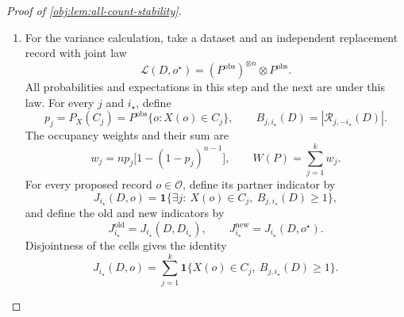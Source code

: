 \documentclass[11pt]{article}
\begin{document}
\begin{proof}[Proof of \cref{obj:lem:all-count-stability}]
\begin{enumerate}
If \(D\) and \(D'\) have replacement Hamming distance one, their set of differing positions is a singleton. Write its position as \(i_\star\); then
\[
D_i=D_i'\qquad(i\ne i_\star).
\]
The erased cell tuples are therefore identical, and hence
\[
F_{\kappa,j}^{(-i_\star)}(D)
=F_{\kappa,j}^{(-i_\star)}(D').
\]
If the erased position belongs to the cell, reversing its insertion and applying the joint insertion bound gives
\[
\sum_{\kappa\in\{K_N,K_D\}}
\left|F_{\kappa,j}(D)-F_{\kappa,j}^{(-i_\star)}(D)\right|
\le6\,\mathbf1\{X(D_{i_\star})\in C_j\}.
\]
If it belongs elsewhere, the erased and original tuples coincide and the left side is zero. Applying this bound to both datasets and using their common erased contribution gives
\[
\sum_{\kappa\in\{K_N,K_D\}}
|F_{\kappa,j}(D)-F_{\kappa,j}(D')|
\le
6\,\mathbf1\{X(D_{i_\star})\in C_j\}
+6\,\mathbf1\{X(D'_{i_\star})\in C_j\}.
\]
The cells form a disjoint partition of the public window, so every covariate belongs to at most one cell. Thus
\[
\begin{aligned}
|S_N(D)-S_N(D')|+|S_D(D)-S_D(D')|
&\le\sum_{j=1}^k\sum_{\kappa\in\{K_N,K_D\}}
|F_{\kappa,j}(D)-F_{\kappa,j}(D')|\\
&\le6\sum_{j=1}^k\mathbf1\{X(D_{i_\star})\in C_j\}
+6\sum_{j=1}^k\mathbf1\{X(D'_{i_\star})\in C_j\}\\
&\le12.
\end{aligned}
\]
This argument includes empty cells, singleton cells, and the transition to occupancy two.

\item For the variance calculation, take a dataset and an independent replacement record with joint law
\[
\mathcal L(D,o^\star)
=(P^{\mathrm{obs}})^{\otimes n}\otimes P^{\mathrm{obs}}.
\]
All probabilities and expectations in this step and the next are under this law. For every \(j\) and \(i_\star\), define
\[
p_j=P_X(C_j)
=P^{\mathrm{obs}}\{o:X(o)\in C_j\},
\qquad
B_{j,i_\star}(D)=|\mathscr R_{j,-i_\star}(D)|.
\]
The occupancy weights and their sum are
\[
w_j=np_j\bigl[1-(1-p_j)^{n-1}\bigr],
\qquad
W(P)=\sum_{j=1}^k w_j.
\]
For every proposed record \(o\in\mathcal O\), define its partner indicator by
\[
J_{i_\star}(D,o)
=
\mathbf1\{\exists j:\ X(o)\in C_j,\ B_{j,i_\star}(D)\ge1\},
\]
and define the old and new indicators by
\[
J_{i_\star}^{\mathrm{old}}=J_{i_\star}(D,D_{i_\star}),
\qquad
J_{i_\star}^{\mathrm{new}}=J_{i_\star}(D,o^\star).
\]
Disjointness of the cells gives the identity
\[
J_{i_\star}(D,o)
=\sum_{j=1}^k
\mathbf1\{X(o)\in C_j,\ B_{j,i_\star}(D)\ge1\}.
\]


\end{enumerate}
\end{proof}
\end{document}
